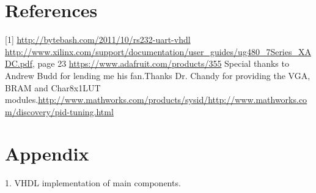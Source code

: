 \documentclass{article}
\begin{document}
\newpage
\section{References}
[1] \url{http://bytebash.com/2011/10/rs232-uart-vhdl} \newline
[2] \url{http://www.xilinx.com/support/documentation/user_guides/ug480_7Series_XADC.pdf}, page 23 \newline
[3] \url{https://www.adafruit.com/products/355} \newline
[4] Special thanks to Andrew Budd for lending me his fan.\newline
[5] Thanks Dr. Chandy for providing the VGA, BRAM and Char8x1LUT modules.\newline
[6] \url{http://www.mathworks.com/products/sysid/}\newline
[7] \url{http://www.mathworks.com/discovery/pid-tuning.html}
\section{Appendix}
1. VHDL implementation of main components.
\end{document}
